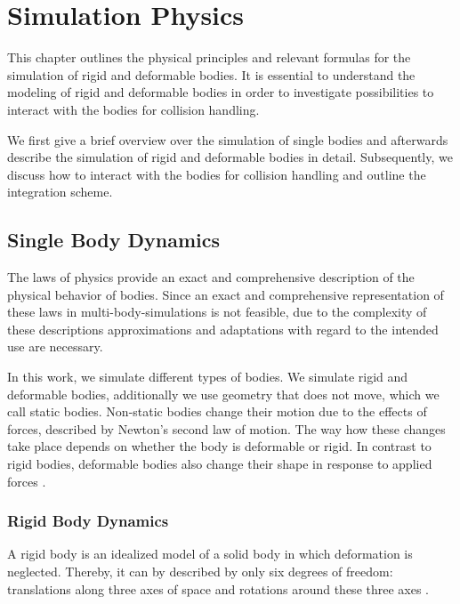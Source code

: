 \chapter{Simulation Physics}
\label{ch:SimPhys}
This chapter outlines the physical principles and relevant formulas for the simulation of rigid and deformable bodies.
It is essential to understand the modeling of rigid and deformable bodies in order to investigate possibilities to interact with the bodies for collision handling.

We first give a brief overview over the simulation of single bodies and afterwards describe the simulation of rigid and deformable bodies in detail.
Subsequently, we discuss how to interact with the bodies for collision handling and outline the integration scheme.

\section{Single Body Dynamics}
\label{sec:MultiBodyDynamics}
The laws of physics provide an exact and comprehensive description of the physical behavior of bodies. Since an exact and comprehensive representation of these laws in multi-body-simulations is not feasible, due to the complexity of these descriptions approximations and adaptations with regard to the intended use are necessary.

In this work, we simulate different types of bodies. We simulate rigid and deformable bodies, additionally we use geometry that does not move, which we call static bodies.
Non-static bodies change their motion due to the effects of forces, described by Newton's second law of motion. The way how these changes take place depends on whether the body is deformable or rigid.  In contrast to rigid bodies, deformable bodies also change their shape in response to applied forces \cite{BENDER2007}.

\subsection{Rigid Body Dynamics}
\label{sec:RigidBodyDynamics}
A rigid body is an idealized model of a solid body in which deformation is neglected.
Thereby, it can by described by only six degrees of freedom: translations along three axes of space and rotations around these three axes \cite{BENDER2007}.

